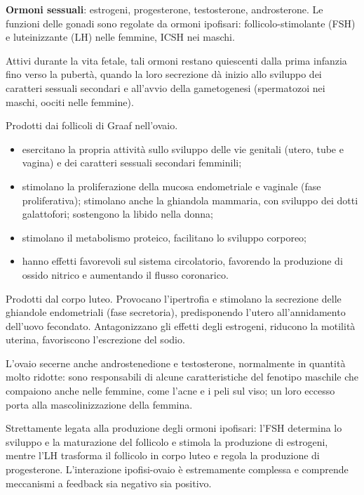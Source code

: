 \textbf{Ormoni sessuali}: estrogeni, progesterone, testosterone,
androsterone. Le funzioni delle gonadi sono regolate da ormoni ipofisari:
follicolo-stimolante (FSH) e luteinizzante (LH) nelle femmine, ICSH nei
maschi.

Attivi durante la vita fetale, tali ormoni restano quiescenti dalla prima
infanzia fino verso la pubertà, quando la loro secrezione dà inizio allo
sviluppo dei caratteri sessuali secondari e all'avvio della gametogenesi
(spermatozoi nei maschi, oociti nelle femmine).

Prodotti dai follicoli di Graaf nell'ovaio.
\begin{itemize}
  \item esercitano la propria attività sullo sviluppo delle vie genitali
    (utero, tube e vagina) e dei caratteri sessuali secondari femminili;
  \item stimolano la proliferazione della mucosa endometriale e vaginale
    (fase proliferativa); stimolano anche la ghiandola mammaria, con
    sviluppo dei dotti galattofori; sostengono la libido nella donna;
  \item stimolano il metabolismo proteico, facilitano lo sviluppo corporeo;
  \item hanno effetti favorevoli sul sistema circolatorio, favorendo la
    produzione di ossido nitrico e aumentando il flusso coronarico.
\end{itemize}

Prodotti dal corpo luteo. Provocano l'ipertrofia e stimolano la secrezione
delle ghiandole endometriali (fase secretoria), predisponendo l'utero
all'annidamento dell'uovo fecondato. Antagonizzano gli effetti degli
estrogeni, riducono la motilità uterina, favoriscono l'escrezione del
sodio.

L'ovaio secerne anche androstenedione e testosterone, normalmente in
quantità molto ridotte: sono responsabili di alcune caratteristiche del
fenotipo maschile che compaiono anche nelle femmine, come l'acne e i peli
sul viso; un loro eccesso porta alla mascolinizzazione della femmina.

Strettamente legata alla produzione degli ormoni ipofisari: l'FSH
determina lo sviluppo e la maturazione del follicolo e stimola la
produzione di estrogeni, mentre l'LH trasforma il follicolo in corpo luteo
e regola la produzione di progesterone. L'interazione ipofisi-ovaio è
estremamente complessa e comprende meccanismi a feedback sia negativo sia
positivo.

